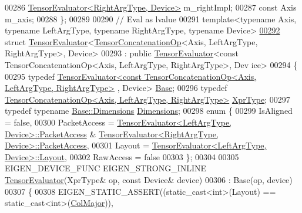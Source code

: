 \begin{DoxyCode}
00286     \hyperlink{struct_eigen_1_1_tensor_evaluator}{TensorEvaluator<RightArgType, Device>} m\_rightImpl;
00287     \textcolor{keyword}{const} Axis m\_axis;
00288 \};
00289 
00290 \textcolor{comment}{// Eval as lvalue}
00291 \textcolor{keyword}{template}<\textcolor{keyword}{typename} Axis, \textcolor{keyword}{typename} LeftArgType, \textcolor{keyword}{typename} RightArgType, \textcolor{keyword}{typename} Device>
\hyperlink{struct_eigen_1_1_tensor_evaluator_3_01_tensor_concatenation_op_3_01_axis_00_01_left_arg_type_00_7f27325ca3102a6730769e76427d2ca7}{00292}   \textcolor{keyword}{struct }\hyperlink{struct_eigen_1_1_tensor_evaluator}{TensorEvaluator}<\hyperlink{class_eigen_1_1_tensor_concatenation_op}{TensorConcatenationOp}<Axis, LeftArgType, 
      RightArgType>, Device>
00293   : \textcolor{keyword}{public} \hyperlink{struct_eigen_1_1_tensor_evaluator}{TensorEvaluator}<const TensorConcatenationOp<Axis, LeftArgType, RightArgType>, Dev
      ice>
00294 \{
00295   \textcolor{keyword}{typedef} 
      \hyperlink{struct_eigen_1_1_tensor_evaluator}{TensorEvaluator<const TensorConcatenationOp<Axis, LeftArgType, RightArgType>}
      , Device> \hyperlink{struct_eigen_1_1_tensor_evaluator_3_01const_01_tensor_concatenation_op_3_01_axis_00_01_left_arg_e37e1b61d31098a96aab7c22793b325c}{Base};
00296   \textcolor{keyword}{typedef} \hyperlink{class_eigen_1_1_tensor_concatenation_op}{TensorConcatenationOp<Axis, LeftArgType, RightArgType>}
       \hyperlink{class_eigen_1_1_tensor_concatenation_op}{XprType};
00297   \textcolor{keyword}{typedef} \textcolor{keyword}{typename} \hyperlink{struct_eigen_1_1_d_sizes}{Base::Dimensions} \hyperlink{struct_eigen_1_1_d_sizes}{Dimensions};
00298   \textcolor{keyword}{enum} \{
00299     IsAligned = \textcolor{keyword}{false},
00300     PacketAccess = \hyperlink{struct_eigen_1_1_tensor_evaluator}{TensorEvaluator<LeftArgType, Device>::PacketAccess}
       & \hyperlink{struct_eigen_1_1_tensor_evaluator}{TensorEvaluator<RightArgType, Device>::PacketAccess},
00301     Layout = \hyperlink{struct_eigen_1_1_tensor_evaluator}{TensorEvaluator<LeftArgType, Device>::Layout},
00302     RawAccess = \textcolor{keyword}{false}
00303   \};
00304 
00305   EIGEN\_DEVICE\_FUNC EIGEN\_STRONG\_INLINE \hyperlink{struct_eigen_1_1_tensor_evaluator}{TensorEvaluator}(XprType& op, \textcolor{keyword}{const} Device& device)
00306     : Base(op, device)
00307   \{
00308     EIGEN\_STATIC\_ASSERT((static\_cast<int>(Layout) == static\_cast<int>(\hyperlink{group__enums_ggaacded1a18ae58b0f554751f6cdf9eb13a0cbd4bdd0abcfc0224c5fcb5e4f6669a}{ColMajor})), 

\end{DoxyCode}
